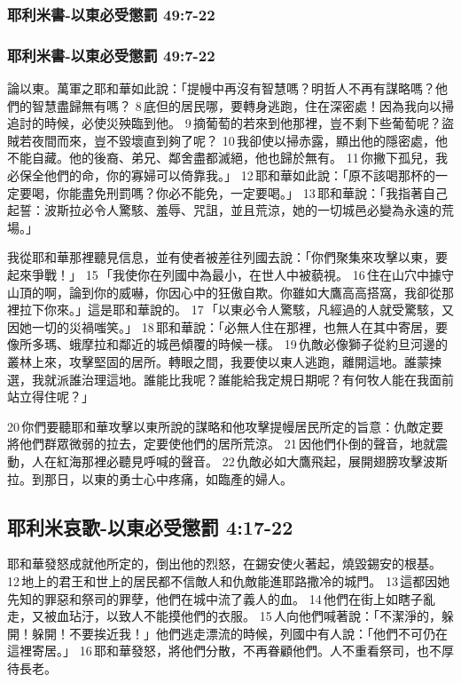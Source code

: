 \subsubsection{耶利米書-以東必受懲罰 49:7-22}



\subsubsection{耶利米書-以東必受懲罰 49:7-22}

論以東。萬軍之耶和華如此說：「提幔中再沒有智慧嗎？明哲人不再有謀略嗎？他們的智慧盡歸無有嗎？ 8 底但的居民哪，要轉身逃跑，住在深密處！因為我向以掃追討的時候，必使災殃臨到他。 9 摘葡萄的若來到他那裡，豈不剩下些葡萄呢？盜賊若夜間而來，豈不毀壞直到夠了呢？ 10 我卻使以掃赤露，顯出他的隱密處，他不能自藏。他的後裔、弟兄、鄰舍盡都滅絕，他也歸於無有。 11 你撇下孤兒，我必保全他們的命，你的寡婦可以倚靠我。」 12 耶和華如此說：「原不該喝那杯的一定要喝，你能盡免刑罰嗎？你必不能免，一定要喝。」 13 耶和華說：「我指著自己起誓：波斯拉必令人驚駭、羞辱、咒詛，並且荒涼，她的一切城邑必變為永遠的荒場。」

我從耶和華那裡聽見信息，並有使者被差往列國去說：「你們聚集來攻擊以東，要起來爭戰！」 15 「我使你在列國中為最小，在世人中被藐視。 16 住在山穴中據守山頂的啊，論到你的威嚇，你因心中的狂傲自欺。你雖如大鷹高高搭窩，我卻從那裡拉下你來。」這是耶和華說的。 17 「以東必令人驚駭，凡經過的人就受驚駭，又因她一切的災禍嗤笑。」 18 耶和華說：「必無人住在那裡，也無人在其中寄居，要像所多瑪、蛾摩拉和鄰近的城邑傾覆的時候一樣。 19 仇敵必像獅子從約旦河邊的叢林上來，攻擊堅固的居所。轉眼之間，我要使以東人逃跑，離開這地。誰蒙揀選，我就派誰治理這地。誰能比我呢？誰能給我定規日期呢？有何牧人能在我面前站立得住呢？」

20 你們要聽耶和華攻擊以東所說的謀略和他攻擊提幔居民所定的旨意：仇敵定要將他們群眾微弱的拉去，定要使他們的居所荒涼。 21 因他們仆倒的聲音，地就震動，人在紅海那裡必聽見呼喊的聲音。 22 仇敵必如大鷹飛起，展開翅膀攻擊波斯拉。到那日，以東的勇士心中疼痛，如臨產的婦人。

\subsection{耶利米哀歌-以東必受懲罰 4:17-22}
耶和華發怒成就他所定的，倒出他的烈怒，在錫安使火著起，燒毀錫安的根基。 12 地上的君王和世上的居民都不信敵人和仇敵能進耶路撒冷的城門。 13 這都因她先知的罪惡和祭司的罪孽，他們在城中流了義人的血。 14 他們在街上如瞎子亂走，又被血玷汙，以致人不能摸他們的衣服。 15 人向他們喊著說：「不潔淨的，躲開！躲開！不要挨近我！」他們逃走漂流的時候，列國中有人說：「他們不可仍在這裡寄居。」 16 耶和華發怒，將他們分散，不再眷顧他們。人不重看祭司，也不厚待長老。

